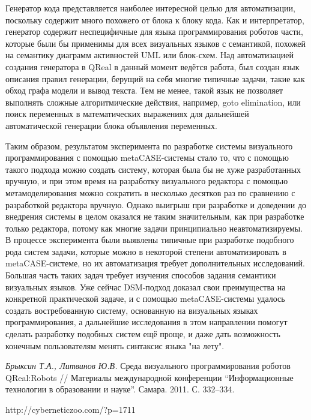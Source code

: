 \documentclass[a4paper]{article}
\begin{document}
Генератор кода представляется наиболее интересной целью для автоматизации, поскольку содержит много похожего от блока к блоку кода. Как и интерпретатор, генератор содержит неспецифичные для языка программирования роботов части, которые были бы применимы для всех визуальных языков с семантикой, похожей на семантику диаграмм активностей UML или блок-схем. Над автоматизацией создания генератора в QReal в данный момент ведётся работа, был создан язык описания правил генерации, берущий на себя многие типичные задачи, такие как обход графа модели и вывод текста. Тем не менее, такой язык не позволяет выполнять сложные алгоритмические действия, например, goto elimination, или поиск переменных в математических выражениях для дальнейшей автоматической генерации блока объявления переменных.

Таким образом, результатом эксперимента по разработке системы визуального программирования с помощью metaCASE-системы стало то, что с помощью такого подхода можно создать систему, которая была бы не хуже разработанных вручную, и при этом время на разработку визуального редактора с помощью метамоделирования можно сократить в несколько десятков раз по сравнению с разработкой редактора вручную. Однако выигрыш при разработке и доведении до внедрения системы в целом оказался не таким значительным, как при разработке только редактора, потому как многие задачи принципиально неавтоматизируемы. В процессе эксперимента были выявлены типичные при разработке подобного рода систем задачи, которые можно в некоторой степени автоматизировать в metaCASE-системе, но их автоматизация требует дополнительных исследований. Большая часть таких задач требует изучения способов задания семантики визуальных языков. Уже сейчас DSM-подход доказал свои преимущества на конкретной практической задаче, и с помощью metaCASE-системы удалось создать востребованную систему, основанную на визуальных языках программирования, а дальнейшие исследования в этом направлении помогут сделать разработку подобных систем ещё проще, и даже дать возможность конечным пользователям менять синтаксис языка "на лету".

\begin{thebibliography}{9001}

   \emph{Брыксин Т.А., Литвинов Ю.В.} Среда визуального программирования роботов QReal:Robots // Материалы международной конференции ``Информационные технологии в образовании и науке''. Самара. 2011. С. 332--334.
  
   http://cyberneticzoo.com/?p=1711

\end{thebibliography}
\end{document}
